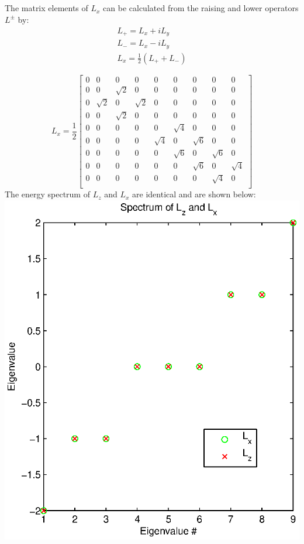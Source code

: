 \documentclass[a4paper,12pt]{article}
\numberwithin{equation}{section}
\begin{document}
\subsection{}
The matrix elements of $L_x$ can be calculated from the raising and lower operators $L^{\pm}$ by:
\begin{gather}
 L_+=L_x+iL_y\\
 L_-=L_x-iL_y\\
 L_x=\frac{1}{2}(L_++L_-)
\end{gather}

\begin{equation}
L_x=\frac{1}{2}
\begin{bmatrix}
 0 & 0 & 0 & 0 & 0 & 0 & 0 & 0 & 0 \\
 0 & 0 & \sqrt{2} & 0 & 0 & 0 & 0 & 0 & 0 \\
 0 & \sqrt{2} & 0 & \sqrt{2} & 0 & 0 & 0 & 0 & 0 \\
 0 & 0 & \sqrt{2} & 0 & 0 & 0 & 0 & 0 & 0 \\
 0 & 0 & 0 & 0 & 0 & \sqrt{4} & 0 & 0 & 0 \\
 0 & 0 & 0 & 0 & \sqrt{4} & 0 & \sqrt{6} & 0 & 0 \\
 0 & 0 & 0 & 0 & 0 & \sqrt{6} & 0 & \sqrt{6} & 0 \\
 0 & 0 & 0 & 0 & 0 & 0 & \sqrt{6} & 0 & \sqrt{4} \\
 0 & 0 & 0 & 0 & 0 & 0 & 0 & \sqrt{4} & 0 \\
\end{bmatrix}
\end{equation}
The energy spectrum of $L_z$ and $L_x$ are identical and are shown below:\\
\includegraphics{Lx_Lz}
\\
\end{document}
